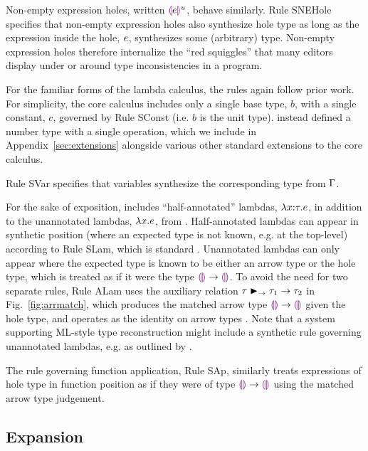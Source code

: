 Non-empty expression holes, written $\textcolor{violet}{\llparenthesis}e\textcolor{violet}{\rrparenthesis}^{u}$, behave similarly. Rule {SNEHole} specifies that non-empty expression holes also synthesize hole type as long as the expression inside the hole, $e$, synthesizes some (arbitrary) type. Non-empty expression holes therefore internalize the ``red squiggles'' that many editors display under or around type inconsistencies in a program.

For the familiar forms of the lambda calculus, the rules again follow prior work. For simplicity, the core calculus includes only a single base type, $b$, with a single constant, $c$, governed by Rule {SConst} (i.e. $b$ is the unit type). \Hazelnut instead defined a number type with a single operation, which we include in Appendix~\ref{sec:extensions} alongside various other standard extensions to the core calculus. 

Rule {SVar} specifies that variables synthesize the corresponding type from $\Gamma$. 

For the sake of exposition, \HazelnutLive includes ``half-annotated'' lambdas, $\lambda x{:}\tau.e$, in addition to the unannotated lambdas, $\lambda x.e$, from \Hazelnut.  Half-annotated lambdas can appear in synthetic position (where an expected type is not known, e.g. at the top-level) according to Rule {SLam}, which is standard \cite{Chlipala:2005da}. Unannotated lambdas can only appear where the expected type is known to be either an arrow type or the hole type, which is treated as if it were the type $\textcolor{violet}{\llparenthesis}\textcolor{violet}{\rrparenthesis} \rightarrow \textcolor{violet}{\llparenthesis}\textcolor{violet}{\rrparenthesis}$. To avoid the need for two separate rules, Rule {ALam} uses the auxiliary relation $\tau \blacktriangleright_{\rightarrow} \tau_1 \rightarrow \tau_2$ in Fig.~\ref{fig:arrmatch}, which produces the matched arrow type $\textcolor{violet}{\llparenthesis}\textcolor{violet}{\rrparenthesis} \rightarrow \textcolor{violet}{\llparenthesis}\textcolor{violet}{\rrparenthesis}$ given the hole type, and operates as the identity on arrow types \cite{DBLP:conf/snapl/SiekVCB15,DBLP:conf/popl/GarciaC15}. Note that a system supporting ML-style type reconstruction \cite{damas1982principal} might include a synthetic rule governing unannotated lambdas, e.g. as outlined by \citet{DBLP:conf/icfp/DunfieldK13}. 

The rule governing function application, Rule {SAp}, similarly treats expressions of hole type in function position as if they were of type $\textcolor{violet}{\llparenthesis}\textcolor{violet}{\rrparenthesis} \rightarrow \textcolor{violet}{\llparenthesis}\textcolor{violet}{\rrparenthesis}$ using the matched arrow type judgement.

\subsection{Expansion}
\label{sec:expansion}

